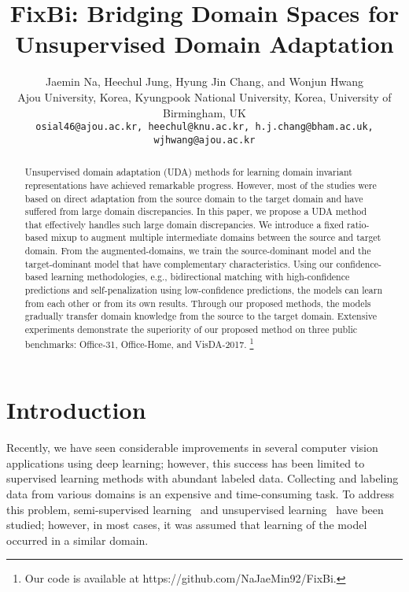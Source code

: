 \documentclass[final]{cvpr}
\begin{document}
\title{FixBi: Bridging Domain Spaces for Unsupervised Domain Adaptation}

\author{Jaemin Na, Heechul Jung, Hyung Jin Chang, and Wonjun Hwang\\
Ajou University, Korea, Kyungpook National University, Korea, University of Birmingham, UK\\
{\tt\small osial46@ajou.ac.kr, heechul@knu.ac.kr, h.j.chang@bham.ac.uk, wjhwang@ajou.ac.kr}
}

\maketitle


\begin{abstract}
Unsupervised domain adaptation (UDA) methods for learning domain invariant representations have achieved remarkable progress. However, most of the studies were based on direct adaptation from the source domain to the target domain and have suffered from large domain discrepancies. In this paper, we propose a UDA method that effectively handles such large domain discrepancies. We introduce a fixed ratio-based mixup to augment multiple intermediate domains between the source and target domain. From the augmented-domains, we train the source-dominant model and the target-dominant model that have complementary characteristics. Using our confidence-based learning methodologies, e.g., bidirectional matching with high-confidence predictions and self-penalization using low-confidence predictions, the models can learn from each other or from its own results. Through our proposed methods, the models gradually transfer domain knowledge from the source to the target domain. Extensive experiments demonstrate the superiority of our proposed method on three public benchmarks: Office-31, Office-Home, and VisDA-2017.
\footnote{
Our code is available at https://github.com/NaJaeMin92/FixBi.}
\end{abstract}

\section{Introduction}
Recently, we have seen considerable improvements in several computer vision applications using deep learning; however, this success has been limited to supervised learning methods with abundant labeled data. 
Collecting and labeling data from various domains is an expensive and time-consuming task. To address this problem, semi-supervised learning~\cite{S4L, MixMatch, FixMatch} and unsupervised learning~\cite{Gidaris2018} have been studied; however, in most cases, it was assumed that learning of the model occurred in a similar domain.
\end{document}
